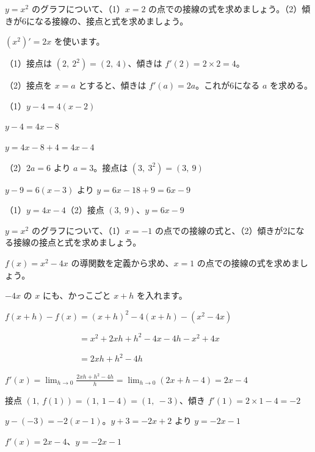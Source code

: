 \begin{reidai}[接線の式]
$y=x^2$ のグラフについて、（1）$x=2$ の点での接線の式を求めましょう。（2）傾きが6になる接線の、接点と式を求めましょう。\par
\kangaekata $(x^2)'=2x$ を使います。\par
\hspace*{4.3\zw}（1）接点は $(2,\ 2^2)=(2,\ 4)$、傾きは $f'(2)=2\times2=4$。\par
\hspace*{4.3\zw}（2）接点を $x=a$ とすると、傾きは $f'(a)=2a$。これが6になる $a$ を求める。\par
\shiki（1）$y-4=4(x-2)$\par
\hspace*{4.3\zw}$y-4=4x-8$\par
\hspace*{4.3\zw}$y=4x-8+4=4x-4$\par
\hspace*{2.6\zw}（2）$2a=6$ より $a=3$。接点は $(3,\ 3^2)=(3,\ 9)$\par
\hspace*{4.3\zw}$y-9=6(x-3)$ より $y=6x-18+9=6x-9$\par
\kotae （1）$y=4x-4$\quad（2）接点 $(3,\ 9)$、$y=6x-9$
\end{reidai}

\begin{jibun}
$y=x^2$ のグラフについて、（1）$x=-1$ の点での接線の式と、（2）傾きが2になる接線の接点と式を求めましょう。
\end{jibun}

\begin{reidai}[導関数から接線を引く]
$f(x)=x^2-4x$ の導関数を定義から求め、$x=1$ の点での接線の式を求めましょう。\par
\kangaekata $-4x$ の $x$ にも、かっこごと $x+h$ を入れます。\par
\shiki $f(x+h)-f(x)=(x+h)^2-4(x+h)-(x^2-4x)$\par
\hspace*{2.6\zw}$\phantom{f(x+h)-f(x)}=x^2+2xh+h^2-4x-4h-x^2+4x$\par
\hspace*{2.6\zw}$\phantom{f(x+h)-f(x)}=2xh+h^2-4h$\par
\hspace*{2.6\zw}$f'(x)=\displaystyle\lim_{h\to0}\frac{2xh+h^2-4h}{h}=\lim_{h\to0}(2x+h-4)=2x-4$\par
\hspace*{2.6\zw}接点 $(1,\ f(1))=(1,\ 1-4)=(1,\ -3)$、傾き $f'(1)=2\times1-4=-2$\par
\hspace*{2.6\zw}$y-(-3)=-2(x-1)$。$y+3=-2x+2$ より $y=-2x-1$\par
\kotae $f'(x)=2x-4$、$y=-2x-1$
\end{reidai}

